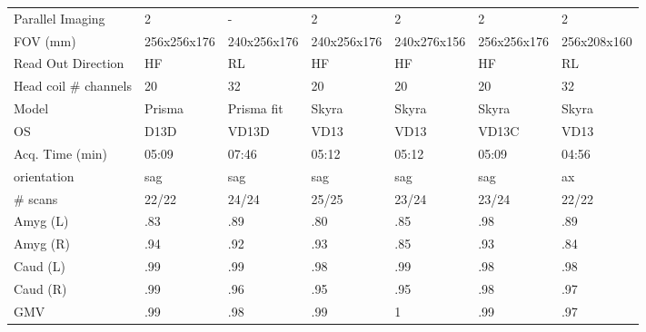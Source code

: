 \documentclass{article}
\begin{document}
\begin{table}
{\begin{tabular}{lllllll}
Parallel Imaging      &                    2 &                    - &                  2 &                   2 &                   2 &                   2 \\
FOV (mm)                  &          256x256x176 &          240x256x176 &        240x256x176 &         240x276x156 &         256x256x176 &         256x208x160 \\
Read Out Direction    &                   HF &                   RL &                 HF &                  HF &                  HF &                  RL \\
Head coil \# channels  &                   20 &                   32 &                 20 &                  20 &                  20 &                  32 \\
Model                 &               Prisma &           Prisma fit &              Skyra &               Skyra &               Skyra &               Skyra \\
OS                    &                 D13D &                VD13D &               VD13 &                VD13 &               VD13C &                VD13 \\
Acq. Time (min)       &             05:09 &             07:46 &           05:12 &            05:12 &            05:09 &            04:56 \\
orientation           &                  sag &                  sag &                sag &                 sag &                 sag &                  ax \\
\# scans & 22/22 & 24/24 & 25/25 & 23/24 & 23/24 &22/22 \\
\midrule
Amyg (L)              &                 .83 &                 .89 &               .80 &                .85 &                .98 &                .89 \\
Amyg (R)              &                 .94 &                 .92 &               .93 &                .85 &                .93 &                .84 \\
Caud (L)              &                 .99 &                 .99 &               .98 &                .99 &                .98 &                .98 \\
Caud (R)              &                 .99 &                 .96 &               .95 &                .95 &                .98 &                .97 \\
GMV                   &                 .99 &                 .98 &               .99 &                1   &                .99 &                .97 \\

\end{tabular}}
\end{table}
\end{document}
